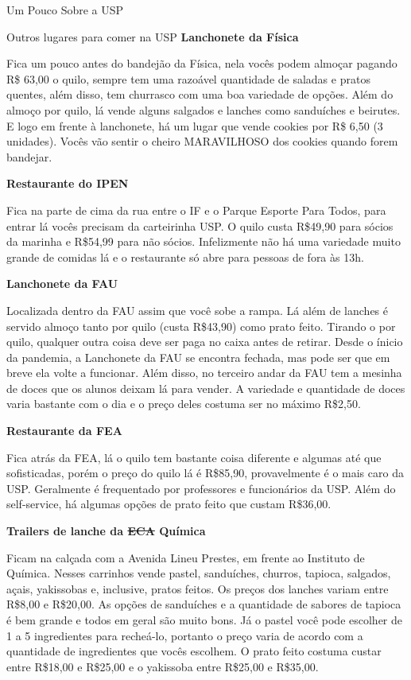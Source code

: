 \begin{secao}{Um Pouco Sobre a USP}
\begin{subsecao}{Outros lugares para comer na USP}
\textbf{Lanchonete da Física}

Fica um pouco antes do bandejão da Física, nela vocês podem almoçar pagando R\$
63,00 o quilo, sempre tem uma razoável quantidade de saladas e pratos
quentes, além disso, tem churrasco com uma boa variedade de opções.
Além do almoço por quilo, lá vende alguns salgados e lanches como sanduíches e
beirutes. E logo em frente à lanchonete, há um lugar que vende cookies por R\$
6,50 (3 unidades). Vocês vão sentir o cheiro MARAVILHOSO dos cookies quando forem bandejar.

\textbf{Restaurante do IPEN}

Fica na parte de cima da rua entre o IF e o Parque Esporte Para Todos, para
entrar lá vocês precisam da carteirinha USP. O quilo custa R\$49,90 para sócios da marinha 
e R\$54,99 para não sócios. Infelizmente não há uma variedade muito grande de comidas lá e o
restaurante só abre para pessoas de fora às 13h.

\textbf{Lanchonete da FAU}

Localizada dentro da FAU assim que você sobe a rampa. Lá além de lanches é
servido almoço tanto por quilo (custa R\$43,90) como prato feito. Tirando o por
quilo, qualquer outra coisa deve ser paga no caixa antes de retirar. Desde o ínicio da pandemia, 
a Lanchonete da FAU se encontra fechada, mas pode ser que em breve ela volte a funcionar. %
Além disso, no terceiro andar da FAU tem a mesinha de doces que os alunos deixam lá
para vender. A variedade e quantidade de doces varia bastante com o dia e o
preço deles costuma ser no máximo R\$2,50.

\textbf{Restaurante da FEA}

Fica atrás da FEA, lá o quilo tem bastante coisa diferente e algumas até que
sofisticadas, porém o preço do quilo lá é R\$85,90, provavelmente é o mais caro
da USP. Geralmente é frequentado por professores e funcionários da USP. Além do
self-service, há algumas opções de prato feito que custam R\$36,00.

\textbf{Trailers de lanche da \sout{ECA} Química}

Ficam na calçada com a Avenida Lineu Prestes, em frente ao Instituto de
Química. Nesses carrinhos vende pastel, sanduíches, churros, tapioca, salgados, açais, 
yakissobas e, inclusive, pratos feitos. Os preços dos lanches variam entre R\$8,00 e R\$20,00. 
As opções de sanduíches e a quantidade de sabores de tapioca é bem grande e todos em geral
são muito bons. Já o pastel você pode escolher de 1 a 5 ingredientes para recheá-lo, portanto 
o preço varia de acordo com a quantidade de ingredientes que vocês escolhem. O prato feito costuma 
custar entre R\$18,00 e R\$25,00 e o yakissoba entre R\$25,00 e R\$35,00.


\end{subsecao}
\end{secao}
